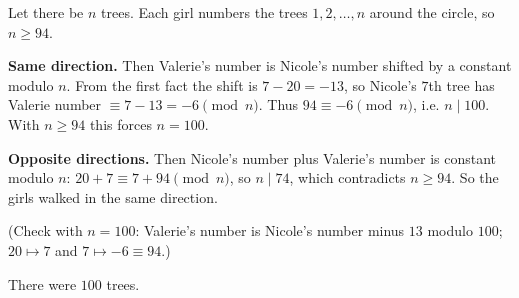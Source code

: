 Let there be $n$ trees. Each girl numbers the trees $1,2,\dots,n$ around the circle, so $n\ge 94$.

\textbf{Same direction.} Then Valerie's number is Nicole's number shifted by a constant modulo $n$. From the first fact the shift is $7-20=-13$, so Nicole's $7$th tree has Valerie number $\equiv 7-13=-6\pmod n$. Thus $94\equiv -6\pmod n$, i.e. $n\mid 100$. With $n\ge 94$ this forces $n=100$.

\textbf{Opposite directions.} Then Nicole's number plus Valerie's number is constant modulo $n$: $20+7\equiv 7+94\pmod n$, so $n\mid 74$, which contradicts $n\ge 94$. So the girls walked in the same direction.

(Check with $n=100$: Valerie's number is Nicole's number minus $13$ modulo $100$; $20\mapsto 7$ and $7\mapsto -6\equiv 94$.)

There were $\boxed{100}$ trees.
